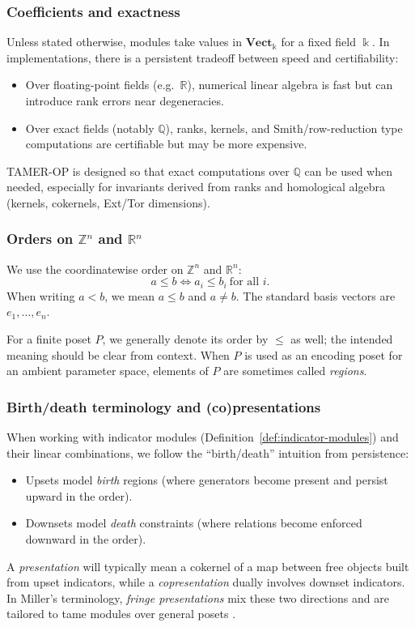 \documentclass{article}
\newcommand{\kk}{\Bbbk}
\newcommand{\<}{\langle}
\renewcommand{\>}{\rangle}
\renewcommand{\iff}{\Leftrightarrow}
\newcommand{\bbb}[1]{\ensuremath{\mathbb{#1}}}
\theoremstyle{definition}
\theoremstyle{remark}
\begin{document}
	\subsubsection*{Coefficients and exactness}
	
	Unless stated otherwise, modules take values in $\mathbf{Vect}_{\kk}$ for a fixed
	field $\kk$.  In implementations, there is a persistent tradeoff between speed and
	certifiability:
	\begin{itemize}
		\item Over floating-point fields (e.g.\ $\bbb{R}$), numerical linear algebra is fast
		but can introduce rank errors near degeneracies.
		\item Over exact fields (notably $\bbb{Q}$), ranks, kernels, and Smith/row-reduction
		type computations are certifiable but may be more expensive.
	\end{itemize}
	TAMER-OP is designed so that exact computations over $\bbb{Q}$ can be used when needed,
	especially for invariants derived from ranks and homological algebra (kernels,
	cokernels, Ext/Tor dimensions).
	
	\subsubsection*{Orders on $\bbb{Z}^n$ and $\bbb{R}^n$}
	
	We use the coordinatewise order on $\bbb{Z}^n$ and $\bbb{R}^n$:
	\[
	a\leq b \iff a_i\leq b_i\ \text{for all }i.
	\]
	When writing $a<b$, we mean $a\leq b$ and $a\neq b$.  The standard basis vectors are
	$e_1,\dots,e_n$.
	
	For a finite poset $P$, we generally denote its order by $\leq$ as well; the intended
	meaning should be clear from context.  When $P$ is used as an encoding poset for an
	ambient parameter space, elements of $P$ are sometimes called \emph{regions}.
	
	\subsubsection*{Birth/death terminology and (co)presentations}
	
	When working with indicator modules (Definition~\ref{def:indicator-modules}) and their
	linear combinations, we follow the ``birth/death'' intuition from persistence:
	\begin{itemize}
		\item Upsets model \emph{birth} regions (where generators become present and persist
		upward in the order).
		\item Downsets model \emph{death} constraints (where relations become enforced downward
		in the order).
	\end{itemize}
	A \emph{presentation} will typically mean a cokernel of a map between free objects
	built from upset indicators, while a \emph{copresentation} dually involves downset
	indicators.  In Miller's terminology, \emph{fringe presentations} mix these two
	directions and are tailored to tame modules over general posets \cite{Mil20}.
	
\end{document}

